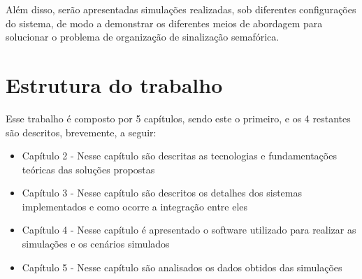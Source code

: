 Além disso, serão apresentadas simulações realizadas, sob diferentes configurações do sistema, de modo a demonstrar os diferentes meios de abordagem para solucionar o problema de organização de sinalização semafórica.


\section{Estrutura do trabalho}

Esse trabalho é composto por 5 capítulos, sendo este o primeiro, e os 4 restantes são descritos, brevemente, a seguir:

\begin{itemize}
    \item Capítulo 2 - Nesse capítulo são descritas as tecnologias e fundamentações teóricas das soluções propostas
    \item Capítulo 3 - Nesse capítulo são descritos os detalhes dos sistemas implementados e como ocorre a integração entre eles
    \item Capítulo 4 - Nesse capítulo é apresentado o software utilizado para realizar as simulações e os cenários simulados
    \item Capítulo 5 - Nesse capítulo são analisados os dados obtidos das simulações
\end{itemize}
